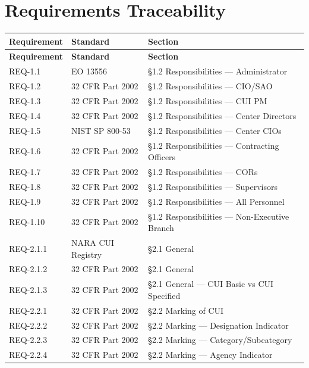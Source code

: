 \documentclass[11pt,letterpaper]{article}
\begin{document}
\section{Requirements Traceability}

\begin{longtable}{@{}l l p{8cm}@{}}
\toprule
\textbf{Requirement} & \textbf{Standard} & \textbf{Section} \\
\midrule
\endfirsthead
\toprule
\textbf{Requirement} & \textbf{Standard} & \textbf{Section} \\
\midrule
\endhead

REQ-1.1 & EO 13556 & \S1.2 Responsibilities --- Administrator \\
REQ-1.2 & 32 CFR Part 2002 & \S1.2 Responsibilities --- CIO/SAO \\
REQ-1.3 & 32 CFR Part 2002 & \S1.2 Responsibilities --- CUI PM \\
REQ-1.4 & 32 CFR Part 2002 & \S1.2 Responsibilities --- Center Directors \\
REQ-1.5 & NIST SP 800-53 & \S1.2 Responsibilities --- Center CIOs \\
REQ-1.6 & 32 CFR Part 2002 & \S1.2 Responsibilities --- Contracting Officers \\
REQ-1.7 & 32 CFR Part 2002 & \S1.2 Responsibilities --- CORs \\
REQ-1.8 & 32 CFR Part 2002 & \S1.2 Responsibilities --- Supervisors \\
REQ-1.9 & 32 CFR Part 2002 & \S1.2 Responsibilities --- All Personnel \\
REQ-1.10 & 32 CFR Part 2002 & \S1.2 Responsibilities --- Non-Executive Branch \\
REQ-2.1.1 & NARA CUI Registry & \S2.1 General \\
REQ-2.1.2 & 32 CFR Part 2002 & \S2.1 General \\
REQ-2.1.3 & 32 CFR Part 2002 & \S2.1 General --- CUI Basic vs CUI Specified \\
REQ-2.2.1 & 32 CFR Part 2002 & \S2.2 Marking of CUI \\
REQ-2.2.2 & 32 CFR Part 2002 & \S2.2 Marking --- Designation Indicator \\
REQ-2.2.3 & 32 CFR Part 2002 & \S2.2 Marking --- Category/Subcategory \\
REQ-2.2.4 & 32 CFR Part 2002 & \S2.2 Marking --- Agency Indicator \\

\end{longtable}
\end{document}
